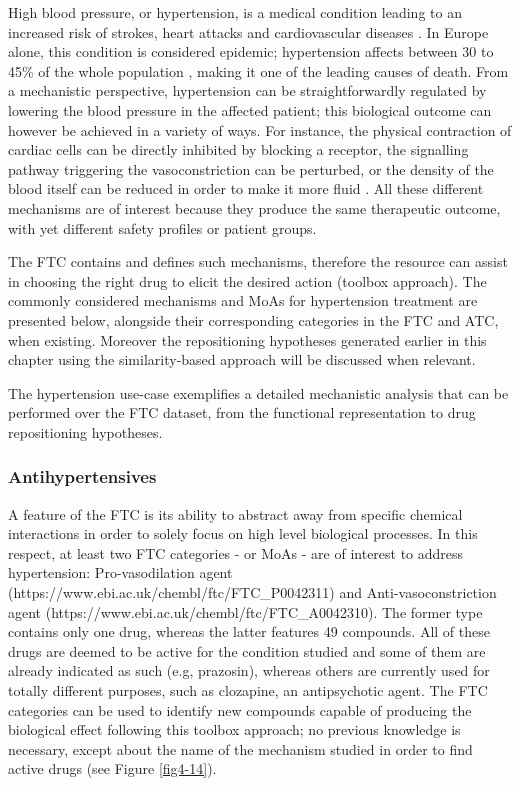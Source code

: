High blood pressure, or hypertension, is a medical condition leading to an increased risk of strokes, heart attacks and cardiovascular diseases \citep{law2003lowering}. In Europe alone, this condition is considered epidemic; hypertension affects between 30 to 45\% of the whole population \citep{swedberg2005task}, making it one of the leading causes of death. From a mechanistic perspective, hypertension can be straightforwardly regulated by lowering the blood pressure in the affected patient; this biological outcome can however be achieved in a variety of ways. For instance, the physical contraction of cardiac cells can be directly inhibited by blocking a receptor, the signalling pathway triggering the vasoconstriction can be perturbed, or the density of the blood itself can be reduced in order to make it more fluid \citep{swedberg2005task}. All these different mechanisms are of interest because they produce the same therapeutic outcome, with yet different safety profiles or patient groups.

The FTC contains and defines such mechanisms, therefore the resource can assist in choosing the right drug to elicit the desired action (toolbox approach). The commonly considered mechanisms and MoAs for hypertension treatment are presented below, alongside their corresponding categories in the FTC and ATC, when existing. Moreover the repositioning hypotheses generated earlier in this chapter using the similarity-based approach will be discussed when relevant.

The hypertension use-case exemplifies a detailed mechanistic analysis that can be performed over the FTC dataset, from the functional representation to drug repositioning hypotheses.

\subsubsection{Antihypertensives}
A feature of the FTC is its ability to abstract away from specific chemical interactions in order to solely focus on high level biological processes. In this respect, at least two FTC categories - or MoAs - are of interest to address hypertension: Pro-vasodilation agent (https://www.ebi.ac.uk/chembl/ftc/FTC\_P0042311) and Anti-vasoconstriction agent (https://www.ebi.ac.uk/chembl/ftc/FTC\_A0042310). The former type contains only one drug, whereas the latter features 49 compounds. All of these drugs are deemed to be active for the condition studied and some of them are already indicated as such (e.g, prazosin), whereas others are currently used for totally different purposes, such as clozapine, an antipsychotic agent. The FTC categories can be used to identify new compounds capable of producing the biological effect following this toolbox approach; no previous knowledge is necessary, except about the name of the mechanism studied in order to find active drugs (see Figure \ref{fig4-14}).

